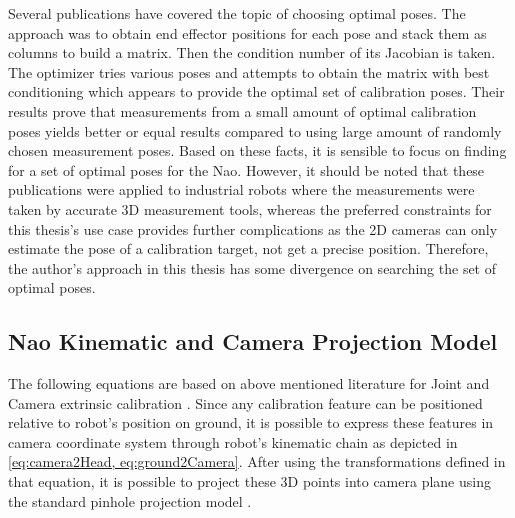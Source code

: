 \documentclass[english, printversion, nomenclature, notitle]{tuvisionthesis} %
\begin{document}
Several publications have covered the topic of choosing optimal poses. The approach was to obtain end effector positions for each pose and stack them as columns to build a matrix. Then the condition number of its Jacobian is taken. The optimizer tries various poses and attempts to obtain the matrix with best conditioning which appears to provide the optimal set of calibration poses. Their results prove that measurements from a small amount of optimal calibration poses yields better or equal results compared to using large amount of randomly chosen measurement poses. Based on these facts, it is sensible to focus on finding for a set of optimal poses for the Nao. However, it should be noted that these publications were applied to industrial robots where the measurements were taken by accurate 3D measurement tools, whereas the preferred constraints for this thesis's use case provides further complications as the 2D cameras can only estimate the pose of a calibration target, not get a precise position. Therefore, the author's approach in this thesis has some divergence on searching the set of optimal poses\cite{khalil_identifiable_1991, zhou_selecting_2014, borm_experimental_nodate, sun2008observability}.

\subsection{Nao Kinematic and Camera Projection Model}
\label{subsec:projection}

The following equations are based on above mentioned literature for Joint and Camera extrinsic calibration \cite{darshana_adikari_team_2017, hartley2003multiple}. Since any calibration feature can be positioned relative to robot's position on ground, it is possible to express these features in camera coordinate system through robot's kinematic chain as depicted in \cref{eq:camera2Head, eq:ground2Camera}. After using the transformations defined in that equation, it is possible to project these 3D points into camera plane using the standard pinhole projection model \cite{hartley2003multiple, opencv_library}.
\end{document}
